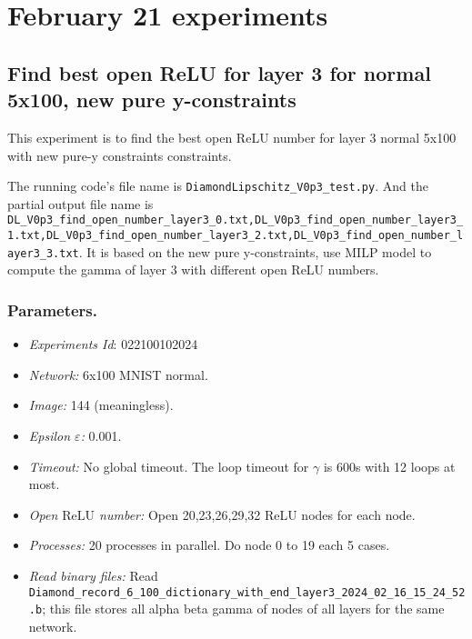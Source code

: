\documentclass{llncs}
\newcommand{\ReLU}{\mathrm{ReLU}}
\begin{document}
\section{February 21 experiments}

\subsection{Find best open ReLU for layer 3 for normal 5x100, new pure y-constraints}

This experiment is to find the best open ReLU number for layer 3 normal 5x100 with new pure-y constraints constraints.

\vspace*{1ex}

The running code's file name is \verb*|DiamondLipschitz_V0p3_test.py|. And the partial output file name is \verb*|DL_V0p3_find_open_number_layer3_0.txt,DL_V0p3_find_open_number_layer3_1.txt,DL_V0p3_find_open_number_layer3_2.txt,DL_V0p3_find_open_number_layer3_3.txt|.  It is based on the new pure y-constraints, use MILP model to compute the gamma of layer 3 with different open ReLU numbers.

\subsubsection*{Parameters.}

\begin{itemize}
	\item\emph{Experiments Id}: 022100102024
	
	\item\emph{Network:} 6x100 MNIST normal. 
	
	\item\emph{Image:} 144 (meaningless).
	
	\item\emph{Epsilon $\varepsilon$:} 0.001.
	
	\item\emph{Timeout:} No global timeout. The loop timeout for $\gamma$ is 600s with 12 loops at most.
	
	\item\emph{Open $\ReLU$ number:} Open 20,23,26,29,32 ReLU nodes for each node.
	
	\item\emph{Processes:} 20 processes in parallel. Do node 0 to 19 each 5 cases.
	
	\item\emph{Read binary files:} Read \verb*|Diamond_record_6_100_dictionary_with_end_layer3_2024_02_16_15_24_52.b|; this file stores all alpha beta gamma of nodes of all layers for the same network. 
\end{itemize}
\end{document}
